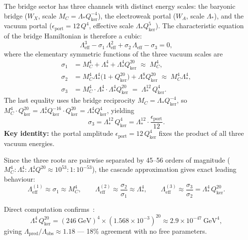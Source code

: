 \documentclass[12pt]{article}
\begin{document}
The bridge sector has three channels with distinct energy scales:
the baryonic bridge ($W_X$, scale $M_C=\Lambda_*Q_{\mathrm{ker}}^{-4}$),
the electroweak portal ($W_A$, scale $\Lambda_*$),
and the vacuum portal
($\epsilon_{\mathrm{port}}=12\,Q^4$, effective scale $\Lambda_*Q_{\mathrm{ker}}^5$).
The characteristic equation of the bridge Hamiltonian is therefore a cubic:
\begin{equation}
\boxed{\Lambda_{\mathrm{eff}}^3
-\sigma_1\,\Lambda_{\mathrm{eff}}^2
+\sigma_2\,\Lambda_{\mathrm{eff}}
-\sigma_3=0,}
\label{eq:cubic}
\end{equation}
where the elementary symmetric functions of the three vacuum scales are
\begin{align}
\sigma_1 &= M_C^4+\Lambda_*^4+\Lambda_*^4 Q_{\mathrm{ker}}^{20}
\;\approx\; M_C^4,
\label{eq:s1}\\
\sigma_2 &= M_C^4\Lambda_*^4\bigl(1+Q_{\mathrm{ker}}^{20}\bigr)
+\Lambda_*^8 Q_{\mathrm{ker}}^{20}
\;\approx\; M_C^4\Lambda_*^4,
\label{eq:s2}\\
\sigma_3 &= M_C^4\cdot\Lambda_*^4\cdot\Lambda_*^4 Q_{\mathrm{ker}}^{20}
\;=\; \Lambda_*^{12}\,Q_{\mathrm{ker}}^4.
\label{eq:s3}
\end{align}
The last equality uses the bridge reciprocity
$M_C=\Lambda_*Q_{\mathrm{ker}}^{-4}$,
so $M_C^4\cdot Q_{\mathrm{ker}}^{20}=\Lambda_*^4 Q_{\mathrm{ker}}^{-16}\cdot Q_{\mathrm{ker}}^{20}=\Lambda_*^4 Q_{\mathrm{ker}}^4$,
yielding
\begin{equation}
\sigma_3=\Lambda_*^{12}\,Q_{\mathrm{ker}}^4
=\Lambda_*^{12}\cdot\frac{\epsilon_{\mathrm{port}}}{12}.
\end{equation}
\textbf{Key identity:} the portal amplitude
$\epsilon_{\mathrm{port}}=12\,Q_{\mathrm{ker}}^4$ fixes the product
of all three vacuum energies.

Since the three roots are pairwise separated by 45--56 orders of magnitude
($M_C^4:\Lambda_*^4:\Lambda_*^4 Q^{20} \approx 10^{53}:1:10^{-53}$),
the cascade approximation gives exact leading behaviour:
\begin{equation}
\Lambda_{\mathrm{eff}}^{(1)}\approx\sigma_1\approx M_C^4,\qquad
\Lambda_{\mathrm{eff}}^{(2)}\approx\frac{\sigma_2}{\sigma_1}\approx\Lambda_*^4,\qquad
\boxed{\Lambda_{\mathrm{eff}}^{(3)}\approx\frac{\sigma_3}{\sigma_2}
=\Lambda_*^4\,Q_{\mathrm{ker}}^{20}.}
\label{eq:smallroot}
\end{equation}

Direct computation confirms~\cite{numerics}:
\begin{equation}
\Lambda_*^4\,Q_{\mathrm{ker}}^{20}
=(246~\mathrm{GeV})^4\times(1.568\times10^{-3})^{20}
\approx 2.9\times10^{-47}~\mathrm{GeV}^4,
\end{equation}
giving $\Lambda_{\mathrm{pred}}/\Lambda_{\mathrm{obs}}\approx1.18$
--- 18\% agreement with no free parameters.
\end{document}

